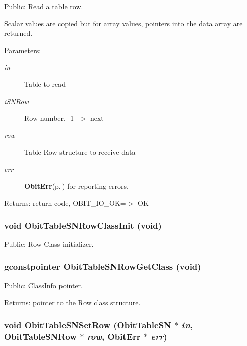 Public: Read a table row. 

Scalar values are copied but for array values, pointers into the data array are returned. \begin{Desc}
\item[Parameters:]
\begin{description}
\item[{\em in}]Table to read \item[{\em i\-SNRow}]Row number, -1 -$>$ next \item[{\em row}]Table Row structure to receive data \item[{\em err}]{\bf Obit\-Err}{\rm (p.\,\pageref{structObitErr})} for reporting errors. \end{description}
\end{Desc}
\begin{Desc}
\item[Returns:]return code, OBIT\_\-IO\_\-OK=$>$ OK \end{Desc}
\subsubsection{\setlength{\rightskip}{0pt plus 5cm}void Obit\-Table\-SNRow\-Class\-Init (void)}\label{ObitTableSN_8h_a7}


Public: Row Class initializer. 

\subsubsection{\setlength{\rightskip}{0pt plus 5cm}gconstpointer Obit\-Table\-SNRow\-Get\-Class (void)}\label{ObitTableSN_8h_a9}


Public: Class\-Info pointer. 

\begin{Desc}
\item[Returns:]pointer to the Row class structure. \end{Desc}
\subsubsection{\setlength{\rightskip}{0pt plus 5cm}void Obit\-Table\-SNSet\-Row ({\bf Obit\-Table\-SN} $\ast$ {\em in}, {\bf Obit\-Table\-SNRow} $\ast$ {\em row}, {\bf Obit\-Err} $\ast$ {\em err})}\label{ObitTableSN_8h_a19}


